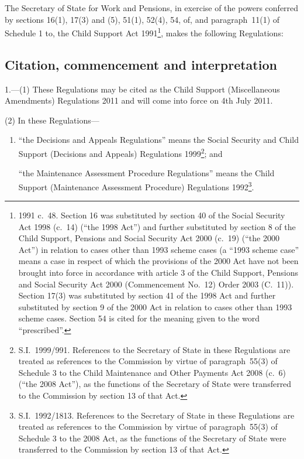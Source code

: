 \documentclass[12pt,a4paper]{article}
\title{\regstitle}
\author{S.I.\ 2011 No.\ 1464}
\date{Made
9th June 2011\\
Laid before Parliament
13th June 2011\\
Coming into~force
4th July 2011
}
\begin{document}
\maketitle

\noindent
The Secretary of State for Work and Pensions, in exercise of the powers conferred by sections 16(1), 17(3) and (5), 51(1), 52(4), 54, of, and paragraph~11(1) of Schedule 1 to, the Child Support Act 1991\footnote{1991 c.~48. Section 16 was substituted by section 40 of the Social Security Act 1998 (c.~14) (“the 1998 Act”) and further substituted by section 8 of the Child Support, Pensions and Social Security Act 2000 (c.~19) (“the 2000 Act”) in relation to cases other than 1993 scheme cases (a “1993 scheme case” means a case in respect of which the provisions of the 2000 Act have not been brought into force in accordance with article 3 of the Child Support, Pensions and Social Security Act 2000 (Commencement No.~12) Order 2003 (C.~11)). Section 17(3) was substituted by section 41 of the 1998 Act and further substituted by section 9 of the 2000 Act in relation to cases other than 1993 scheme cases. Section 54 is cited for the meaning given to the word “prescribed”.}, makes the following Regulations: 

{\sloppy

\tableofcontents

}

\bigskip

\setcounter{secnumdepth}{-2}

\subsection[1. Citation, commencement and interpretation]{Citation, commencement and interpretation}

1.---(1)  These Regulations may be cited as the Child Support (Miscellaneous Amendments) Regulations 2011 and will come into force on 4th July 2011.

(2) In these Regulations—
\begin{enumerate}\item[]
“the Decisions and Appeals Regulations” means the Social Security and Child Support (Decisions and Appeals) Regulations 1999\footnote{S.I.~1999/991. References to the Secretary of State in these Regulations are treated as references to the Commission by virtue of paragraph~55(3) of Schedule 3 to the Child Maintenance and Other Payments Act 2008 (c.~6) (“the 2008 Act”), as the functions of the Secretary of State were transferred to the Commission by section 13 of that Act.}; and

“the Maintenance Assessment Procedure Regulations” means the Child Support (Maintenance Assessment Procedure) Regulations 1992\footnote{S.I.~1992/1813. References to the Secretary of State in these Regulations are treated as references to the Commission by virtue of paragraph~55(3) of Schedule 3 to the 2008 Act, as the functions of the Secretary of State were transferred to the Commission by section 13 of that Act.}.
\end{enumerate}
\end{document}
